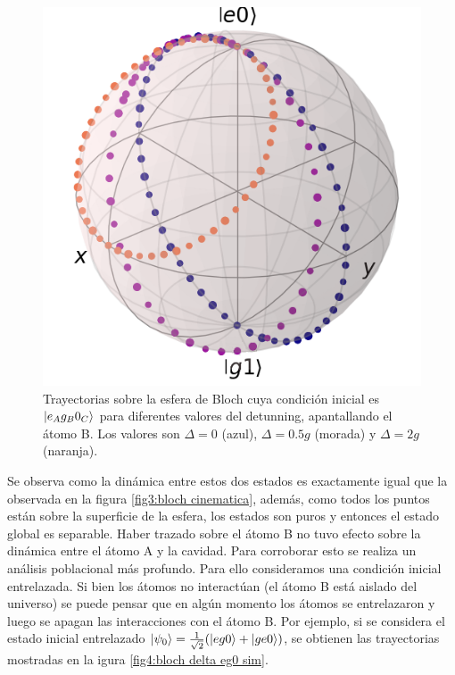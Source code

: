 \begin{figure}[H]
    \begin{minipage}[c]{0.5\textwidth}
        \includegraphics[width=\textwidth]{figuras/ch4/bloch eg0 bloch AC a=0 d=2.0 x=0.0 k=0.0 J=0.0 gamma=0.0 p=0.0.png}
    \end{minipage}\hfill
    \begin{minipage}[c]{0.3\textwidth}
        \caption{Trayectorias sobre la esfera de Bloch cuya condición inicial es $\ket{e_Ag_B0_C}$ para diferentes valores del detunning, apantallando el átomo B. Los valores son $\Delta=0$ (azul), $\Delta=0.5g$ (morada) y $\Delta=2g$ (naranja).}
        \label{fig4:bloch delta eg0}
    \end{minipage}
\end{figure}
Se observa como la dinámica entre estos dos estados es exactamente igual que la observada en la figura \ref{fig3:bloch cinematica}, además, como todos los puntos están sobre la superficie de la esfera, los estados son puros y entonces el estado global es separable. Haber trazado sobre el átomo B no tuvo efecto sobre la dinámica entre el átomo A y la cavidad. Para corroborar esto se realiza un análisis poblacional más profundo.
Para ello consideramos una condición inicial entrelazada. Si bien los átomos no interactúan (el átomo B está aislado del universo) se puede pensar que en algún momento los átomos se entrelazaron y luego se apagan las interacciones con el átomo B. Por ejemplo, si se considera el estado inicial entrelazado $\ket{\psi_0}=\frac{1}{\sqrt{2}}(\ket{eg0}+\ket{ge0})$, se obtienen las trayectorias mostradas en la igura \ref{fig4:bloch delta eg0 sim}.
